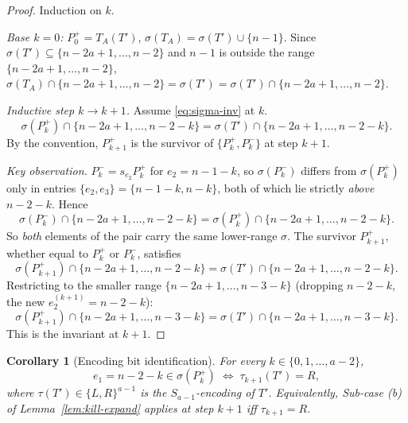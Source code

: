 \documentclass[11pt]{article}
\newtheorem{corollary}[theorem]{Corollary}
\theoremstyle{definition}
\begin{document}
\begin{proof}
Induction on $k$.

\emph{Base $k=0$:}  $P_0^+=T_A(T')$, $\sigma(T_A)=\sigma(T')\cup\{n-1\}$.
Since $\sigma(T')\subseteq\{n-2a+1,\ldots,n-2\}$ and $n-1$ is outside
the range $\{n-2a+1,\ldots,n-2\}$,
$\sigma(T_A)\cap\{n-2a+1,\ldots,n-2\}=\sigma(T')=
\sigma(T')\cap\{n-2a+1,\ldots,n-2\}$.

\emph{Inductive step $k\to k+1$.}  Assume \eqref{eq:sigma-inv} at $k$.
\[
   \sigma(P_k^+)\cap\{n-2a+1,\ldots,n-2-k\}
   =\sigma(T')\cap\{n-2a+1,\ldots,n-2-k\}.
\]
By the convention, $P_{k+1}^+$ is the survivor of
$\{P_k^+,P_k^-\}$ at step $k+1$.

\emph{Key observation.}  $P_k^-=s_{e_2}P_k^+$ for $e_2=n-1-k$, so
$\sigma(P_k^-)$ differs from $\sigma(P_k^+)$ only in entries
$\{e_2,e_3\}=\{n-1-k,n-k\}$, both of which lie strictly
\emph{above} $n-2-k$.  Hence
\[
   \sigma(P_k^-)\cap\{n-2a+1,\ldots,n-2-k\}
   =\sigma(P_k^+)\cap\{n-2a+1,\ldots,n-2-k\}.
\]
So \emph{both} elements of the pair carry the same lower-range
$\sigma$.  The survivor $P_{k+1}^+$, whether equal to $P_k^+$ or
$P_k^-$, satisfies
\[
   \sigma(P_{k+1}^+)\cap\{n-2a+1,\ldots,n-2-k\}
   =\sigma(T')\cap\{n-2a+1,\ldots,n-2-k\}.
\]
Restricting to the smaller range $\{n-2a+1,\ldots,n-3-k\}$ (dropping
$n-2-k$, the new $e_2^{(k+1)}=n-2-k$):
\[
   \sigma(P_{k+1}^+)\cap\{n-2a+1,\ldots,n-3-k\}
   =\sigma(T')\cap\{n-2a+1,\ldots,n-3-k\}.
\]
This is the invariant at $k+1$.
\end{proof}

\begin{corollary}[Encoding bit identification]\label{cor:encoding}
For every $k\in\{0,1,\ldots,a-2\}$,
\[
   e_1=n-2-k\in\sigma(P_k^+)
   \;\Longleftrightarrow\;
   \tau_{k+1}(T')=R,
\]
where $\tau(T')\in\{L,R\}^{a-1}$ is the $S_{a-1}$-encoding of $T'$.
Equivalently, Sub-case (b) of Lemma~\ref{lem:kill-expand} applies at
step $k+1$ iff $\tau_{k+1}=R$.
\end{corollary}
\end{document}
